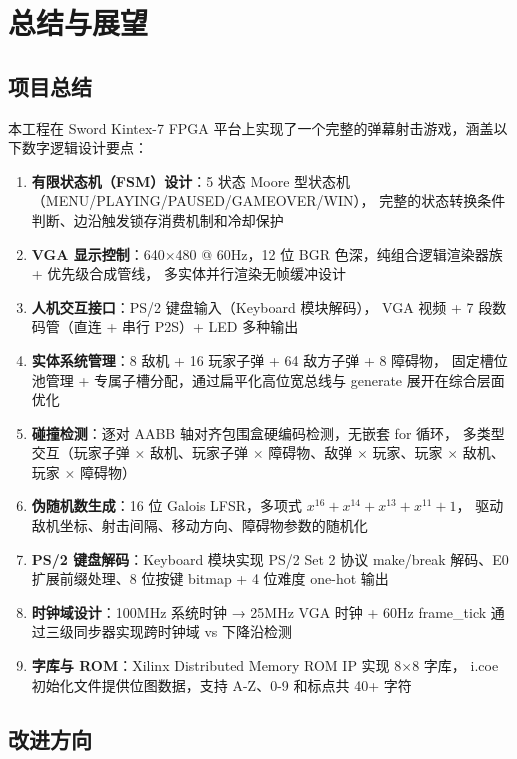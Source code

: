 \documentclass[12pt,a4paper]{ctexart}
\begin{document}
\section{总结与展望}

\subsection{项目总结}

本工程在 Sword Kintex-7 FPGA 平台上实现了一个完整的弹幕射击游戏，涵盖以下数字逻辑设计要点：

\begin{enumerate}[label=(\arabic*)]
    \item \textbf{有限状态机（FSM）设计}：5 状态 Moore 型状态机（MENU/PLAYING/PAUSED/GAMEOVER/WIN），
    完整的状态转换条件判断、边沿触发锁存消费机制和冷却保护
    \item \textbf{VGA 显示控制}：640$\times$480 @ 60Hz，12 位 BGR 色深，纯组合逻辑渲染器族 + 优先级合成管线，
    多实体并行渲染无帧缓冲设计
    \item \textbf{人机交互接口}：PS/2 键盘输入（Keyboard 模块解码），
    VGA 视频 + 7 段数码管（直连 + 串行 P2S）+ LED 多种输出
    \item \textbf{实体系统管理}：8 敌机 + 16 玩家子弹 + 64 敌方子弹 + 8 障碍物，
    固定槽位池管理 + 专属子槽分配，通过扁平化高位宽总线与 generate 展开在综合层面优化
    \item \textbf{碰撞检测}：逐对 AABB 轴对齐包围盒硬编码检测，无嵌套 for 循环，
    多类型交互（玩家子弹 $\times$ 敌机、玩家子弹 $\times$ 障碍物、敌弹 $\times$ 玩家、玩家 $\times$ 敌机、玩家 $\times$ 障碍物）
    \item \textbf{伪随机数生成}：16 位 Galois LFSR，多项式 $x^{16}+x^{14}+x^{13}+x^{11}+1$，
    驱动敌机坐标、射击间隔、移动方向、障碍物参数的随机化
    \item \textbf{PS/2 键盘解码}：Keyboard 模块实现 PS/2 Set 2 协议 make/break 解码、E0 扩展前缀处理、8 位按键 bitmap + 4 位难度 one-hot 输出
    \item \textbf{时钟域设计}：100MHz 系统时钟 → 25MHz VGA 时钟 + 60Hz frame\_tick
    通过三级同步器实现跨时钟域 vs 下降沿检测
    \item \textbf{字库与 ROM}：Xilinx Distributed Memory ROM IP 实现 8$\times$8 字库，
    i.coe 初始化文件提供位图数据，支持 A-Z、0-9 和标点共 40+ 字符
\end{enumerate}

\subsection{改进方向}
\end{document}
